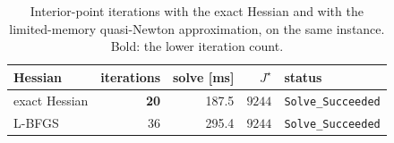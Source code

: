\begin{table}[htbp]
  \centering
  \small
  \caption{Interior-point iterations with the exact Hessian and with the limited-memory quasi-Newton approximation, on the same instance. Bold: the lower iteration count.}
  \label{res:tab:hess}
  \begin{tabular}{lrrrl}
    \toprule
    Hessian & iterations & solve [ms] & $J^\star$ & status \\
    \midrule
    exact Hessian & \textbf{20} & 187.5 & $9244$ & \texttt{Solve\_Succeeded} \\
    L-BFGS & 36 & 295.4 & $9244$ & \texttt{Solve\_Succeeded} \\
    \bottomrule
  \end{tabular}
\end{table}


